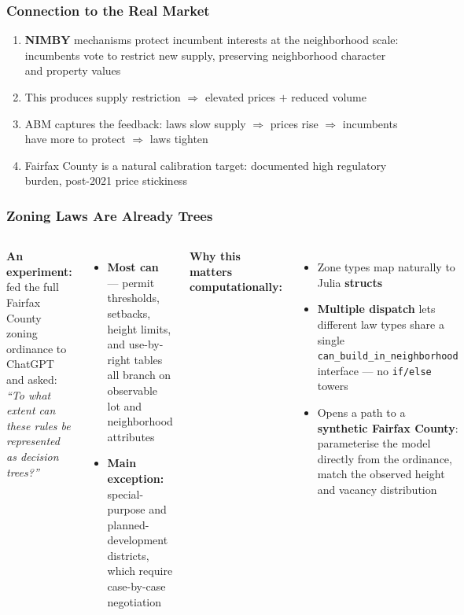 \documentclass{beamer}
\begin{document}

\begin{frame}
  \frametitle{Connection to the Real Market}
  \begin{enumerate}
    \item \textbf{NIMBY} mechanisms protect incumbent interests at the neighborhood scale:\\
      \textcolor{nimbygray}{incumbents vote to restrict new supply, preserving neighborhood character and property values}
    \item This produces \textcolor{nimbyred}{supply restriction} $\Rightarrow$ elevated prices $+$ reduced volume
    \item ABM captures the \textcolor{nimbygreen}{feedback}: laws slow supply $\Rightarrow$ prices rise $\Rightarrow$ incumbents have more to protect $\Rightarrow$ laws tighten
    \item Fairfax County is a natural calibration target: documented high regulatory burden, post-2021 price stickiness
  \end{enumerate}
\end{frame}

\begin{frame}
  \frametitle{Zoning Laws Are Already Trees}
  \begin{columns}
    \textcolor{nimbyyellow}{\textbf{An experiment:}} fed the full Fairfax County
    zoning ordinance to ChatGPT and asked:\\[0.4em]
    \textit{``To what extent can these rules be represented as decision trees?''}
    \vspace{0.4em}
    \begin{itemize}
      \small
      \item \textcolor{nimbygreen}{\textbf{Most can}} — permit thresholds, setbacks,
        height limits, and use-by-right tables all branch on observable lot and
        neighborhood attributes
      \item \textcolor{nimbyred}{\textbf{Main exception:}} special-purpose and
        planned-development districts, which require case-by-case negotiation
    \end{itemize}
    \textcolor{nimbyblue}{\textbf{Why this matters computationally:}}
    \begin{itemize}
      \small
      \item Zone types map naturally to Julia \textbf{structs}
      \item \textbf{Multiple dispatch} lets different law types share a single
        \texttt{can\_build\_in\_neighborhood} interface — no \texttt{if/else} towers
      \item Opens a path to a \textbf{synthetic Fairfax County}: parameterise
        the model directly from the ordinance, match the observed height and
        vacancy distribution
    \end{itemize}
  \end{columns}
\end{frame}
\end{document}
